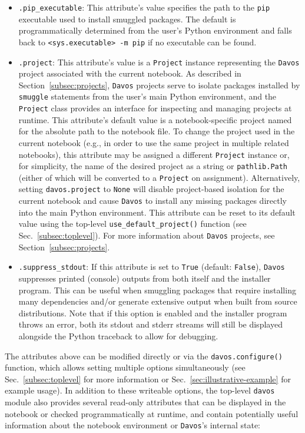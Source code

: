 \documentclass[preprint,12pt,a4paper]{elsarticle}
\begin{document}
\begin{itemize}
\item \texttt{.pip\_executable}: This attribute's value specifies the
  path to the \texttt{pip} executable used to install smuggled
  packages. The default is programmatically determined from the user's Python
  environment and falls back to \texttt{<sys.executable> -m pip} if no
  executable can be found.

\item \texttt{.project}: This attribute's value is a \texttt{Project} instance representing the \texttt{Davos} project associated with the current notebook.
  As described in Section~\ref{subsec:projects}, \texttt{Davos} projects serve to isolate packages installed by \texttt{smuggle} statements from the user's main Python environment, and the \texttt{Project} class provides an interface for inspecting and managing projects at runtime.
  This attribute's default value is a notebook-specific project named for the absolute path to the notebook file.
  To change the project used in the current notebook (e.g., in order to use the same project in multiple related notebooks), this attribute may be assigned a different \texttt{Project} instance or, for simplicity, the name of the desired project as a string or \texttt{pathlib.Path} (either of which will be converted to a \texttt{Project} on assignment).
  Alternatively, setting \texttt{davos.project} to \texttt{None} will disable project-based isolation for the current notebook and cause \texttt{Davos} to install any missing packages directly into the main Python environment.
  This attribute can be reset to its default value using the top-level \texttt{use\_default\_project()} function (see Sec.~\ref{subsec:toplevel}).
  For more information about \texttt{Davos} projects, see Section~\ref{subsec:projects}.

\item \texttt{.suppress\_stdout}: If this attribute is set to
  \texttt{True} (default: \texttt{False}), \texttt{Davos} suppresses
  printed (console) outputs from both itself and the installer program.
  This can be useful when smuggling packages that require installing many
  dependencies and/or generate extensive output when built from source
  distributions. Note that if this option is enabled and the installer
  program throws an error, both its stdout and stderr streams will still be
  displayed alongside the Python traceback to allow for debugging.

\end{itemize}

\noindent The attributes above can be modified directly or via the \texttt{davos.configure()} function, which allows setting multiple options simultaneously (see Sec.~\ref{subsec:toplevel} for more information or Sec.~\ref{sec:illustrative-example} for example usage).
In addition to these writeable options, the top-level \texttt{davos} module also provides several read-only attributes that can be displayed in the notebook or checked programmatically at runtime, and contain potentially useful information about the notebook environment or \texttt{Davos}'s internal state:
\end{document}
